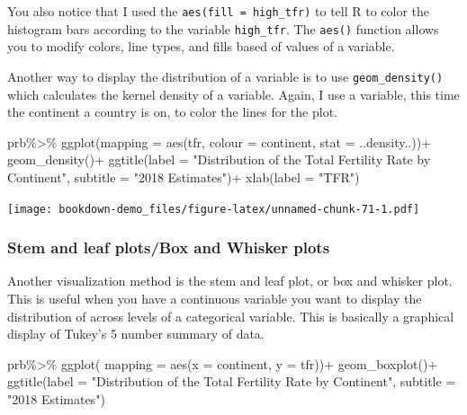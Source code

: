 \documentclass[
]{article}
\newenvironment{Shaded}{\begin{snugshade}}{\end{snugshade}}
\newcommand{\AttributeTok}[1]{\textcolor[rgb]{0.77,0.63,0.00}{#1}}
\newcommand{\FunctionTok}[1]{\textcolor[rgb]{0.00,0.00,0.00}{#1}}
\newcommand{\NormalTok}[1]{#1}
\newcommand{\SpecialCharTok}[1]{\textcolor[rgb]{0.00,0.00,0.00}{#1}}
\newcommand{\StringTok}[1]{\textcolor[rgb]{0.31,0.60,0.02}{#1}}
\begin{document}
You also notice that I used the \texttt{aes(fill\ =\ high\_tfr)} to tell R to
color the histogram bars according to the variable \texttt{high\_tfr}. The
\texttt{aes()} function allows you to modify colors, line types, and fills
based of values of a variable.

Another way to display the distribution of a variable is to use
\texttt{geom\_density()} which calculates the kernel density of a variable.
Again, I use a variable, this time the continent a country is on, to
color the lines for the plot.

\begin{Shaded}
\begin{Highlighting}[]
\NormalTok{prb}\SpecialCharTok{\%\textgreater{}\%}
\FunctionTok{ggplot}\NormalTok{(}\AttributeTok{mapping =} \FunctionTok{aes}\NormalTok{(tfr,}
                     \AttributeTok{colour =}\NormalTok{ continent,}
                     \AttributeTok{stat =}\NormalTok{ ..density..))}\SpecialCharTok{+}
  \FunctionTok{geom\_density}\NormalTok{()}\SpecialCharTok{+}
  \FunctionTok{ggtitle}\NormalTok{(}\AttributeTok{label =} \StringTok{"Distribution of the Total Fertility Rate by Continent"}\NormalTok{,}
          \AttributeTok{subtitle =} \StringTok{"2018 Estimates"}\NormalTok{)}\SpecialCharTok{+}
  \FunctionTok{xlab}\NormalTok{(}\AttributeTok{label =} \StringTok{"TFR"}\NormalTok{)}
\end{Highlighting}
\end{Shaded}

\texttt{[image: bookdown-demo\_files/figure-latex/unnamed-chunk-71-1.pdf]}

\hypertarget{stem-and-leaf-plotsbox-and-whisker-plots}{%
\subsubsection{Stem and leaf plots/Box and Whisker plots}\label{stem-and-leaf-plotsbox-and-whisker-plots}}

Another visualization method is the stem and leaf plot, or box and
whisker plot. This is useful when you have a continuous variable you
want to display the distribution of across levels of a categorical
variable. This is basically a graphical display of Tukey's 5 number
summary of data.

\begin{Shaded}
\begin{Highlighting}[]
\NormalTok{prb}\SpecialCharTok{\%\textgreater{}\%}
  \FunctionTok{ggplot}\NormalTok{( }\AttributeTok{mapping =} \FunctionTok{aes}\NormalTok{(}\AttributeTok{x =}\NormalTok{ continent, }\AttributeTok{y =}\NormalTok{ tfr))}\SpecialCharTok{+}
  \FunctionTok{geom\_boxplot}\NormalTok{()}\SpecialCharTok{+}
  \FunctionTok{ggtitle}\NormalTok{(}\AttributeTok{label =} \StringTok{"Distribution of the Total Fertility Rate by Continent"}\NormalTok{,}
          \AttributeTok{subtitle =} \StringTok{"2018 Estimates"}\NormalTok{)}
\end{Highlighting}
\end{Shaded}
\end{document}
